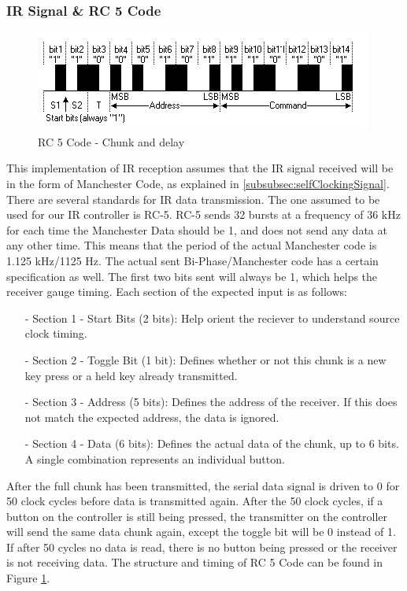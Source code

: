 \documentclass[]{article}
\begin{document}
\subsubsection{IR Signal \& RC 5 Code}
\begin{figure}[H]\centering
    \includegraphics[width=\linewidth]{figures/RC5_Timing.png}
    \caption{RC 5 Code - Chunk and delay \cite{rc5Timing}}
    \label{fig:rc5Code}
\end{figure}
This implementation of IR reception assumes that the IR signal received will be in the form of  Manchester Code, as explained in \ref{subsubsec:selfClockingSignal}.
There are several standards for IR data transmission. The one assumed to be used for our IR controller is RC-5. RC-5 sends 32 bursts at a frequency of 36 kHz for each time the Manchester Data should be 1, and does not send any data at any other time.
This means that the period of the actual Manchester code is 1.125 kHz/1125 Hz. 
The actual sent Bi-Phase/Manchester code has a certain specification as well. The first two bits sent will always be 1, which helps the receiver gauge timing. Each section of the expected input is as follows:
\begin{itemize}
    \item[-] Section 1 - Start Bits (2 bits): Help orient the reciever to understand source clock timing.
    \item[-] Section 2 - Toggle Bit (1 bit): Defines whether or not this chunk is a new key press or a held key already transmitted.
    \item[-] Section 3 - Address (5 bits): Defines the address of the receiver. If this does not match the expected address, the data is ignored.
    \item[-] Section 4 - Data (6 bits): Defines the actual data of the chunk, up to 6 bits. A single combination represents an individual button.
\end{itemize}
After the full chunk has been transmitted, the serial data signal is driven to 0 for 50 clock cycles before data is transmitted again.
After the 50 clock cycles, if a button on the controller is still being pressed, the transmitter on the controller will send the same data chunk again, except the toggle bit will be 0 instead of 1.
If after 50 cycles no data is read, there is no button being pressed or the receiver is not receiving data.\cite{vishayIr}
The structure and timing of RC 5 Code can be found in Figure \ref{fig:rc5Code}.
\end{document}
